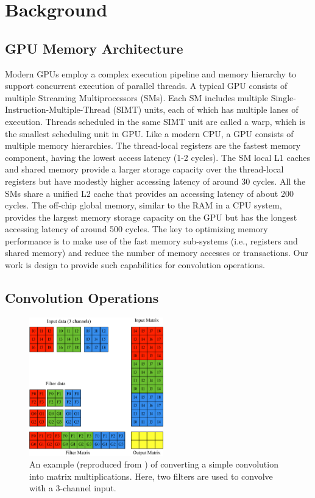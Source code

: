 
\section{Background}
\subsection{GPU Memory Architecture}
Modern GPUs employ a complex execution pipeline and memory hierarchy to support concurrent execution of parallel threads. A typical GPU
consists of multiple Streaming Multiprocessors (SMs). Each SM includes multiple Single-Instruction-Multiple-Thread (SIMT) units, each of
which has multiple lanes of execution. Threads scheduled in the same SIMT unit are called a warp, which is the smallest scheduling unit in
GPU. Like a modern CPU, a GPU consists of multiple memory hierarchies. The thread-local registers are the fastest memory component, having
the lowest access latency (1-2 cycles). The SM local L1 caches and shared memory provide a larger storage capacity over the thread-local
registers but have modestly higher accessing latency of around 30 cycles. All the SMs share a unified L2 cache that provides an accessing
latency of about 200 cycles. The off-chip global memory, similar to the RAM in a CPU system, provides the largest memory storage capacity
on the GPU but has the longest accessing latency of around 500 cycles. The key to optimizing memory performance is to make use of the fast
memory sub-systems (i.e., registers and shared memory) and reduce the number of memory accesses or transactions. Our work is design to
provide such capabilities for convolution operations.

\subsection{Convolution Operations}
\begin{figure}[t!]
\centering
  \includegraphics[width=0.75\columnwidth,height=6cm]{./figure/convlowering.eps}
  \caption{An example (reproduced from \cite{ChetlurWVCTCS14}) of converting a simple convolution into matrix multiplications. Here, two filters are used to convolve with a 3-channel input.}
  \label{fig:convlowering}
\end{figure}

